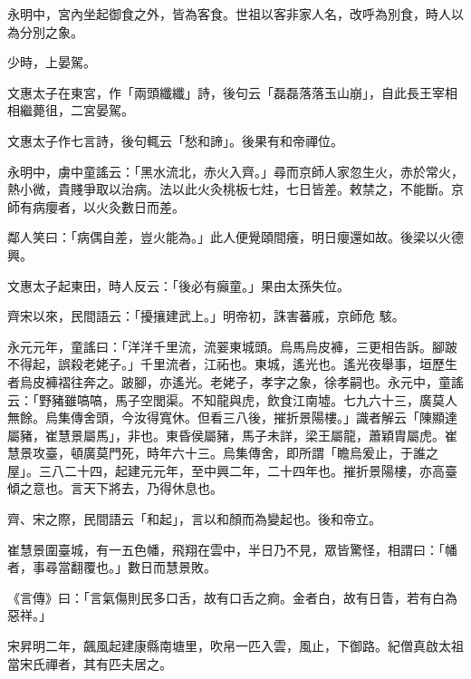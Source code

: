 \begin{pinyinscope}
 永明中，宮內坐起御食之外，皆為客食。世祖以客非家人名，改呼為別食，時人以為分別之象。



 少時，上晏駕。



 文惠太子在東宮，作「兩頭纖纖」詩，後句云「磊磊落落玉山崩」，自此長王宰相相繼薨徂，二宮晏駕。



 文惠太子作七言詩，後句輒云「愁和諦」。後果有和帝禪位。



 永明中，虜中童謠云：「黑水流北，赤火入齊。」尋而京師人家忽生火，赤於常火，熱小微，貴賤爭取以治病。法以此火灸桃板七炷，七日皆差。敕禁之，不能斷。京師有病癭者，以火灸數日而差。



 鄰人笑曰：「病偶自差，豈火能為。」此人便覺頤間癢，明日癭還如故。後梁以火德興。



 文惠太子起東田，時人反云：「後必有癲童。」果由太孫失位。



 齊宋以來，民間語云：「擾攘建武上。」明帝初，誅害蕃戚，京師危
 駭。



 永元元年，童謠曰：「洋洋千里流，流翣東城頭。烏馬烏皮褲，三更相告訴。腳跛不得起，誤殺老姥子。」千里流者，江祏也。東城，遙光也。遙光夜舉事，垣歷生者烏皮褲褶往奔之。跛腳，亦遙光。老姥子，孝字之象，徐孝嗣也。永元中，童謠云：「野豬雖嗃嗃，馬子空閭渠。不知龍與虎，飲食江南墟。七九六十三，廣莫人無餘。烏集傳舍頭，今汝得寬休。但看三八後，摧折景陽樓。」識者解云「陳顯達屬豬，崔慧景屬馬」，非也。東昏侯屬豬，馬子未詳，梁王屬龍，蕭穎胄屬虎。崔慧景攻臺，頓廣莫門死，時年六十三。烏集傳舍，即所謂「瞻烏爰止，于誰之屋」。三八二十四，起建元元年，至中興二年，二十四年也。摧折景陽樓，亦高臺傾之意也。言天下將去，乃得休息也。



 齊、宋之際，民間語云「和起」，言以和顏而為變起也。後和帝立。



 崔慧景圍臺城，有一五色幡，飛翔在雲中，半日乃不見，眾皆驚怪，相謂曰：「幡者，事尋當翻覆也。」數日而慧景敗。



 《言傳》曰：「言氣傷則民多口舌，故有口舌之痾。金者白，故有日眚，若有白為惡祥。」



 宋昇明二年，飆風起建康縣南塘里，吹帛一匹入雲，風止，下御路。紀僧真啟太祖當宋氏禪者，其有匹夫居之。




\end{pinyinscope}
